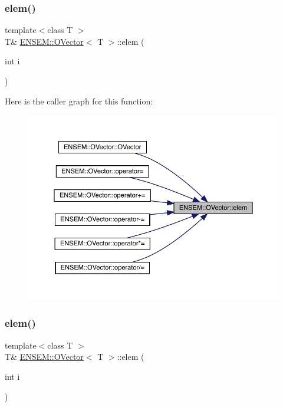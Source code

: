 \mbox{\label{classENSEM_1_1OVector_a8d84b5c1145d0647107413d254450417}} 
\subsubsection{\texorpdfstring{elem()}{elem()}\hspace{0.1cm}{\footnotesize\ttfamily [2/6]}}
{\footnotesize\ttfamily template$<$class T $>$ \\
T\& \mbox{\hyperlink{classENSEM_1_1OVector}{E\+N\+S\+E\+M\+::\+O\+Vector}}$<$ T $>$\+::elem (\begin{DoxyParamCaption}\item[{int}]{i }\end{DoxyParamCaption})\hspace{0.3cm}{\ttfamily [inline]}}

Here is the caller graph for this function\+:
\nopagebreak
\begin{figure}[H]
\begin{center}
\leavevmode
\includegraphics[width=350pt]{d0/d8d/classENSEM_1_1OVector_a8d84b5c1145d0647107413d254450417_icgraph}
\end{center}
\end{figure}
\mbox{\label{classENSEM_1_1OVector_a8d84b5c1145d0647107413d254450417}} 
\subsubsection{\texorpdfstring{elem()}{elem()}\hspace{0.1cm}{\footnotesize\ttfamily [3/6]}}
{\footnotesize\ttfamily template$<$class T $>$ \\
T\& \mbox{\hyperlink{classENSEM_1_1OVector}{E\+N\+S\+E\+M\+::\+O\+Vector}}$<$ T $>$\+::elem (\begin{DoxyParamCaption}\item[{int}]{i }\end{DoxyParamCaption})\hspace{0.3cm}{\ttfamily [inline]}}

